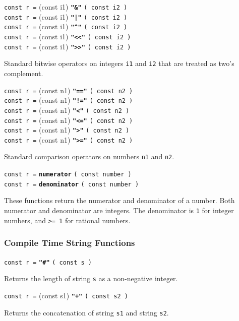 \documentclass[12pt]{article}
\newcommand{\ttkey}[1]{{\tt \bfseries #1}}
\newenvironment{indpar}[1][0.3in]%
	{\begin{list}{}%
		     {\setlength{\itemsep}{0in}%
		      \setlength{\topsep}{0in}%
		      \setlength{\parsep}{1ex}%
		      \setlength{\labelwidth}{#1}%
		      \setlength{\leftmargin}{#1}%
		      \addtolength{\leftmargin}{\labelsep}}%
	 \item}%
	{\end{list}}
\begin{document}
{\tt const r =} (const i1) \ttkey{"\&"} {\tt ( const i2 )} \\
{\tt const r =} (const i1) \ttkey{"|"} {\tt ( const i2 )} \\
{\tt const r =} (const i1) \ttkey{"\textasciicircum"} {\tt ( const i2 )} \\
{\tt const r =} (const i1) \ttkey{"<{}<"} {\tt ( const i2 )} \\
{\tt const r =} (const i1) \ttkey{">{}>"} {\tt ( const i2 )}
\begin{indpar}
Standard bitwise operators on integers {\tt i1} and {\tt i2}
that are treated as two's complement.
\end{indpar}

{\tt const r =} (const n1) \ttkey{"=="} {\tt ( const n2 )} \\
{\tt const r =} (const n1) \ttkey{"!="} {\tt ( const n2 )} \\
{\tt const r =} (const n1) \ttkey{"<"} {\tt ( const n2 )} \\
{\tt const r =} (const n1) \ttkey{"<="} {\tt ( const n2 )} \\
{\tt const r =} (const n1) \ttkey{">"} {\tt ( const n2 )} \\
{\tt const r =} (const n1) \ttkey{">="} {\tt ( const n2 )}
\begin{indpar}
Standard comparison operators on numbers {\tt n1} and {\tt n2}.
\end{indpar}

{\tt const r =} \ttkey{numerator} {\tt ( const number )} \\
{\tt const r =} \ttkey{denominator} {\tt ( const number )}
\begin{indpar}
These functions return the numerator and denominator of a number.
Both numerator and denominator are integers.
The denominator is {\tt 1} for integer numbers, and {\tt >= 1}
for rational numbers.
\end{indpar}

\subsubsection{Compile Time String Functions}

{\tt const r =} \ttkey{"\#"} {\tt ( const s )}
\begin{indpar}
Returns the length of string {\tt s} as a non-negative integer.
\end{indpar}

{\tt const r =} (const s1) \ttkey{"+"} {\tt ( const s2 )}
\begin{indpar}
Returns the concatenation of string {\tt s1}
and string {\tt s2}.
\end{indpar}
\end{document}

